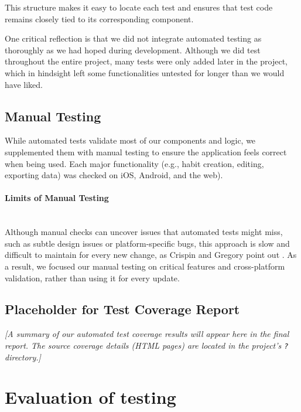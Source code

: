 This structure makes it easy to locate each test and ensures that test code remains closely tied to its corresponding component.

One critical reflection is that we did not integrate automated testing as thoroughly as we had hoped during development. Although we did test throughout the entire project, many tests were only added later in the project, which in hindsight left some functionalities untested for longer than we would have liked.

\subsection{Manual Testing}

While automated tests validate most of our components and logic, we supplemented them with manual testing to ensure the application feels correct when being used. Each major functionality (e.g., habit creation, editing, exporting data) was checked on iOS, Android, and the web).

\paragraph{Limits of Manual Testing}\mbox{}\\
Although manual checks can uncover issues that automated tests might miss, such as subtle design issues or platform-specific bugs, this approach is slow and difficult to maintain for every new change, as Crispin and Gregory point out \cite{crispin2009agiletesting}. As a result, we focused our manual testing on critical features and cross-platform validation, rather than using it for every update.

\subsection{Placeholder for Test Coverage Report} \label{sect:test-coverage} \vspace{12pt} \noindent \textit{[A summary of our automated test coverage results will appear here in the final report. The source coverage details (HTML pages) are located in the project’s \texttt{?} directory.]}


\section{Evaluation of testing} \label{sect:testing:evaluation}

